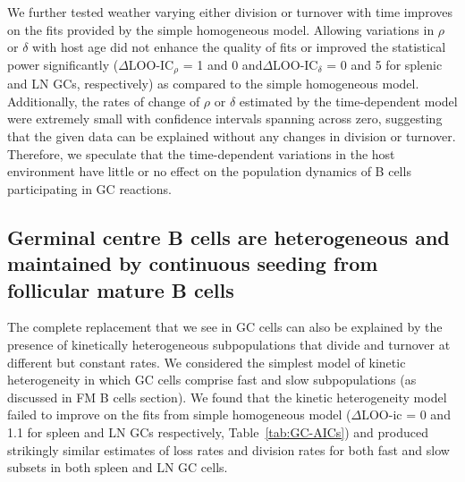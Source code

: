 \documentclass[11pt]{article}
\newcommand{\red}[1]{{\color{red}{#1}}}
\begin{document}
			
	We further tested weather varying either division or turnover with time improves on the fits provided by the simple homogeneous model. 
	Allowing variations in $\rho$ or $\delta$ with host age did not enhance the quality of fits or improved the statistical power significantly ($\Delta$LOO-IC$_{\rho}$ = 1 and 0 and$\Delta$LOO-IC$_{\delta}$ = 0 and 5  for splenic and LN GCs, respectively) as compared to the simple homogeneous model. 
	Additionally, the rates of change of $\rho$ or $\delta$ estimated by the time-dependent model were extremely small with confidence intervals spanning across zero, suggesting that the given data can be explained without any changes in division or turnover. %
	Therefore, we speculate that the time-dependent variations in the host environment have little or no effect on the population dynamics of B cells participating in GC reactions.
	
	
	\subsection*{Germinal centre B cells are heterogeneous and maintained by continuous seeding from follicular mature B cells }
	The complete replacement that we see in GC cells can also be explained by the presence of kinetically heterogeneous subpopulations that divide and turnover at different but constant rates. 
	We considered the simplest model of kinetic heterogeneity in which GC cells comprise fast and slow subpopulations (as discussed in FM B cells section).
	We found that the kinetic heterogeneity model failed to improve \red{?????} on the fits from simple homogeneous model ($\Delta$LOO-ic = 0 and 1.1 for spleen and LN GCs respectively, Table~\ref{tab:GC-AICs}) and produced  strikingly similar estimates of loss rates and division rates for both fast and slow subsets in both spleen and LN GC cells.
	
\end{document}
